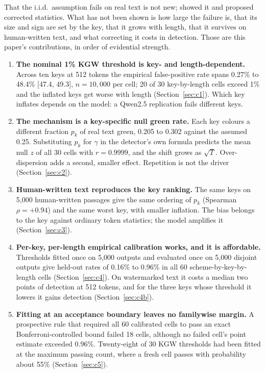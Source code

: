 \documentclass[conference]{IEEEtran}
\begin{document}
That the i.i.d.\ assumption fails on real text is not new;
\citet{fernandez2023bricks} showed it and proposed corrected statistics. What has
not been shown is how large the failure is, that its size and sign are set by the
key, that it grows with length, that it survives on human-written text, and what
correcting it costs in detection. Those are this paper's contributions, in order
of evidential strength.
\begin{enumerate}
  \item \textbf{The nominal 1\% KGW threshold is key- and length-dependent.}
  Across ten keys at 512 tokens the empirical false-positive rate spans 0.27\% to
  48.4\% [47.4, 49.3], $n=10{,}000$ per cell; 20 of 30 key-by-length cells exceed
  1\% and the inflated keys get worse with length (Section~\ref{sec:c1}). Which
  key inflates depends on the model: a Qwen2.5 replication fails different keys.
  \item \textbf{The mechanism is a key-specific null green rate.} Each key colours
  a different fraction $p_k$ of real text green, 0.205 to 0.302 against the assumed
  0.25. Substituting $p_k$ for $\gamma$ in the detector's own formula predicts the
  mean null $z$ of all 30 cells with $r=0.9999$, and the shift grows as $\sqrt{T}$.
  Over-dispersion adds a second, smaller effect. Repetition is not the driver
  (Section~\ref{sec:c2}).
  \item \textbf{Human-written text reproduces the key ranking.} The same keys on
  5,000 human-written passages give the same ordering of $p_k$ (Spearman
  $\rho=+0.94$) and the same worst key, with smaller inflation. The bias belongs to
  the key against ordinary token statistics; the model amplifies it
  (Section~\ref{sec:c3}).
  \item \textbf{Per-key, per-length empirical calibration works, and it is
  affordable.} Thresholds fitted once on 5,000 outputs and evaluated once on
  5,000 disjoint outputs give held-out rates of 0.16\% to 0.96\% in all 60
  scheme-by-key-by-length cells (Section~\ref{sec:c4}). On watermarked text it
  costs a median two points of detection at 512 tokens, and for the three keys
  whose threshold it lowers it gains detection (Section~\ref{sec:c4b}).
  \item \textbf{Fitting at an acceptance boundary leaves no familywise margin.} A
  prospective rule that required all 60 calibrated cells to pass an exact
  Bonferroni-controlled bound failed 18 cells, although no failed cell's point
  estimate exceeded 0.96\%. Twenty-eight of 30 KGW thresholds had been fitted at
  the maximum passing count, where a fresh cell passes with probability about
  55\% (Section~\ref{sec:c5}).
\end{enumerate}
\end{document}

